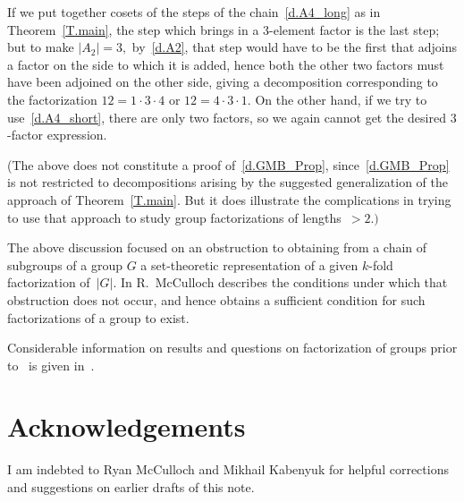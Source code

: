 \documentclass{amsart}
\numberwithin{equation}{section}
\numberwithin{theorem}{section}
\begin{document}
If we put together cosets of the steps of the
chain~\eqref{d.A4_long} as in Theorem~\ref{T.main},
the step which brings in
a $\!3\!$-element factor is the last step;
but to make $|A_2|=3,$ by~\eqref{d.A2}, that step would have to be
the first that adjoins a factor on the side to which it is added,
hence both the other two factors must have been
adjoined on the other side, giving a decomposition corresponding
to the factorization $12  = 1 \cdot 3 \cdot 4$ or
$12 = 4 \cdot 3 \cdot 1.$
On the other hand, if we try to use~\eqref{d.A4_short},
there are only two factors, so we again cannot get
the desired $\!3\!$-factor expression.

(The above does not constitute a proof of~\eqref{d.GMB_Prop},
since~\eqref{d.GMB_Prop} is not restricted to decompositions arising
by the suggested generalization of the approach of Theorem~\ref{T.main}.
But it does illustrate the complications in trying to use
that approach to study group factorizations of lengths~$>2.)$

The above discussion focused on an obstruction to obtaining
from a chain of subgroups of a group $G$ a set-theoretic
representation of a given $\!k\!$-fold factorization of~$|G|.$
In \cite[Theorem~3.1]{McC} R.~McCulloch describes the conditions
under which that obstruction does not occur, and hence obtains
a sufficient condition for such factorizations of a group to exist.

Considerable information on results and questions on factorization
of groups prior to~\cite{MHH_overflow} is given in~\cite{MK}.

\section{Acknowledgements}\label{S.ackn}
I am indebted to Ryan McCulloch and Mikhail Kabenyuk for helpful
corrections and suggestions on earlier drafts of this note.
\end{document}
